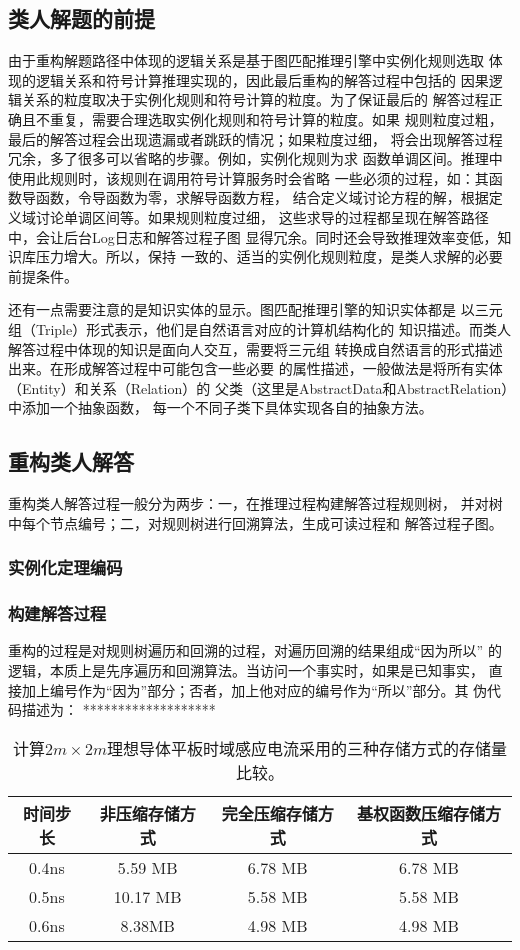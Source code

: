 \documentclass{standalone}
\begin{document}
\subsection{类人解题的前提}
由于重构解题路径中体现的逻辑关系是基于图匹配推理引擎中实例化规则选取
体现的逻辑关系和符号计算推理实现的，因此最后重构的解答过程中包括的
因果逻辑关系的粒度取决于实例化规则和符号计算的粒度。为了保证最后的
解答过程正确且不重复，需要合理选取实例化规则和符号计算的粒度。如果
规则粒度过粗，最后的解答过程会出现遗漏或者跳跃的情况；如果粒度过细，
将会出现解答过程冗余，多了很多可以省略的步骤。例如，实例化规则为求
函数单调区间。推理中使用此规则时，该规则在调用符号计算服务时会省略
一些必须的过程，如：其函数导函数，令导函数为零，求解导函数方程，
结合定义域讨论方程的解，根据定义域讨论单调区间等。如果规则粒度过细，
这些求导的过程都呈现在解答路径中，会让后台Log日志和解答过程子图
显得冗余。同时还会导致推理效率变低，知识库压力增大。所以，保持
一致的、适当的实例化规则粒度，是类人求解的必要前提条件。

还有一点需要注意的是知识实体的显示。图匹配推理引擎的知识实体都是
以三元组（Triple）形式表示，他们是自然语言对应的计算机结构化的
知识描述。而类人解答过程中体现的知识是面向人交互，需要将三元组
转换成自然语言的形式描述出来。在形成解答过程中可能包含一些必要
的属性描述，一般做法是将所有实体（Entity）和关系（Relation）的
父类（这里是AbstractData和AbstractRelation）中添加一个抽象函数，
每一个不同子类下具体实现各自的抽象方法。
\subsection{重构类人解答}
重构类人解答过程一般分为两步：一，在推理过程构建解答过程规则树，
并对树中每个节点编号；二，对规则树进行回溯算法，生成可读过程和
解答过程子图。

\subsubsection{实例化定理编码}

\subsubsection{构建解答过程}
重构的过程是对规则树遍历和回溯的过程，对遍历回溯的结果组成“因为所以”
的逻辑，本质上是先序遍历和回溯算法。当访问一个事实时，如果是已知事实，
直接加上编号作为“因为”部分；否者，加上他对应的编号作为“所以”部分。其
伪代码描述为：
*******************
\begin{table}[h]
	\caption{计算$2m\times 2m$理想导体平板时域感应电流采用的三种存储方式的存储量比较。} 
	\begin{tabular}{|c|c|c|c|} 
		\hline  
		时间步长 & 非压缩存储方式 & 完全压缩存储方式 & 基权函数压缩存储方式 \\
		\hline 
		0.4ns & 5.59 MB & 6.78 MB & 6.78 MB\\  
		\hline  
		0.5ns & 10.17 MB & 5.58 MB & 5.58 MB \\  
		\hline  
		0.6ns & 8.38MB & 4.98 MB & 4.98 MB \\  
		\hline  
	\end{tabular}
	\label{tablea}
\end{table}
\end{document}
